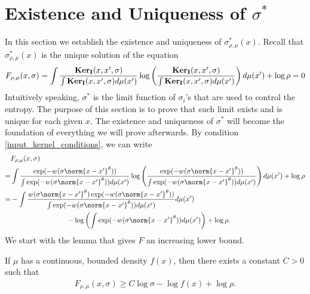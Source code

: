 \section{Existence and Uniqueness of \texorpdfstring{$\sigma^*$}{sigma-star}}\label{tsne:sec:existence_uniqueness}
In this section we establish the existence and uniqueness of $\sigma^*_{\rho,\mu}(x)$. Recall that $\sigma^*_{\rho,\mu}(x)$ is the unique solution of the equation
\begin{align}
    F_{\rho,\mu}(x,\sigma) = \int \frac{\mathbf{Ker}_{\mathbf{I}}(x,x',\sigma)}{\int \mathbf{Ker}_{\mathbf{I}}(x,x',\sigma)d\mu(x')} \log \left(\frac{\mathbf{Ker}_{\mathbf{I}}(x,x',\sigma)}{\int \mathbf{Ker}_{\mathbf{I}}(x,x',\sigma)d\mu(x')}\right) d\mu(x') + \log \rho = 0
\end{align}
Intuitively speaking, $\sigma^*$ is the limit function of $\sigma_i$'s that are used to control the entropy. The purpose of this section is to prove that such limit exists and is unique for each given $x$. The existence and uniqueness of $\sigma^*$ will become the foundation of everything we will prove afterwards. By condition \ref{input_kernel_conditions}, we can write
\begin{align} \label{big_F_formula}
      & F_{\rho,\mu}(x,\sigma) \nonumber                                                                                                                                                                                                                    \\
    = & \int \frac{\exp(-w(\sigma\norm{x-x'}^{\theta}))}{\int \exp(-w(\sigma\norm{x-x'}^{\theta})) d\mu(x')} \log\left(\frac{\exp(-w(\sigma\norm{x-x'}^{\theta}))}{\int \exp(-w(\sigma\norm{x-x'}^{\theta})) d\mu(x')}\right)d\mu(x') + \log \rho \nonumber \\
    = & -\int \frac{w(\sigma\norm{x-x'}^{\theta})\exp(-w(\sigma\norm{x-x'}^{\theta}))}{\int \exp(-w(\sigma\norm{x-x'}^{\theta})) d\mu(x')} d\mu(x') \nonumber                                                                                               \\
      & \qquad \qquad \qquad \qquad - \log \left(\int \exp(-w(\sigma\norm{x-x'}^{\theta}))d\mu(x')\right)  + \log \rho.
\end{align}
We start with the lemma that gives $F$ an increasing lower bound.
\begin{lemma} \label{existence_uniqueness:existence_lemma}
    If $\mu$ has a continuous, bounded density $f(x)$, then there exists a constant $C>0$ such that
    \begin{align}  \label{big_F_lowerbound_final}
        F_{\rho,\mu}(x,\sigma) \geq C \log \sigma - \log f(x) + \log \rho.
    \end{align}
\end{lemma}
